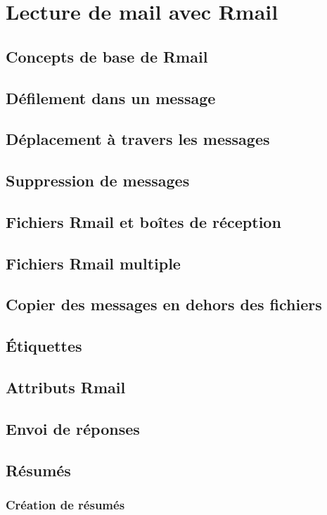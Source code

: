 \chapter{Lecture de mail avec Rmail}\label{chap30}
\section{Concepts de base de Rmail}\label{chap30sec1}
\section{Défilement dans un message}\label{chap30sec2}
\section{Déplacement à travers les messages}\label{chap30sec3}
\section{Suppression de messages}\label{chap30sec4}
\section{Fichiers Rmail et boîtes de réception}\label{chap30sec5}
\section{Fichiers Rmail multiple}\label{chap30sec6}
\section{Copier des messages en dehors des fichiers}\label{chap30sec7}
\section{\'Etiquettes}\label{chap30sec8}
\section{Attributs Rmail}\label{chap30sec9}
\section{Envoi de réponses}\label{chap30sec10}
\section{Résumés}\label{chap30sec11}
\subsection{Création de résumés}\label{chap30sec11subsec1}
